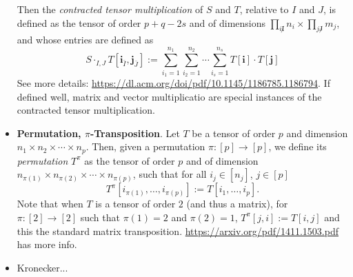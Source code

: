 \begin{itemize}
Then the \textit{contracted tensor multiplication} of $S$ and $T$, relative to $I$ and $J$, is defined as the tensor
of order $p+q-2s$ and of dimensions $\prod_{ i\not I} n_i\times \prod_{j\not J} m_j$, and whose entries are defined as
$$
S\cdot_{I,J} T[\mathbf{i}_{\bar I},\mathbf{j}_{\bar J}]:=\sum_{i_1=1}^{n_1}\sum_{i_2=1}^{n_2}\cdots\sum_{i_s=1}^{n_s} T[\mathbf{i}]\cdot T[\mathbf{j}]
$$
See more details: \url{https://dl.acm.org/doi/pdf/10.1145/1186785.1186794}. If defined well, matrix and vector multiplicatio are special instances of the contracted tensor multiplication.

\item \textbf{Permutation, $\pi$-Transposition}. Let $T$ be a tensor of order $p$ and dimension $n_1\times n_2\times\cdots\times n_p$. Then, given a permutation 
$\pi:[p]\to [p]$, we define its \textit{permutation} $T^\pi$ as the tensor of order $p$ and of dimension
$n_{\pi(1)}\times n_{\pi(2)}\times\cdots\times n_{\pi(p)}$, such that for all $i_j\in[n_j]$, $j\in[p]$
$$
T^{\pi}[i_{\pi(1)},\ldots,i_{\pi(p)}]:=T[i_1,\ldots,i_p].
$$
Note that when $T$ is a tensor of order $2$ (and thus a matrix), for $\pi:[2]\to[2]$ such that $\pi(1)=2$ and $\pi(2)=1$,
$T^\pi[j,i]:=T[i,j]$ and this the standard matrix transposition. \url{https://arxiv.org/pdf/1411.1503.pdf} has more info.

\item Kronecker...
 \end{itemize}


